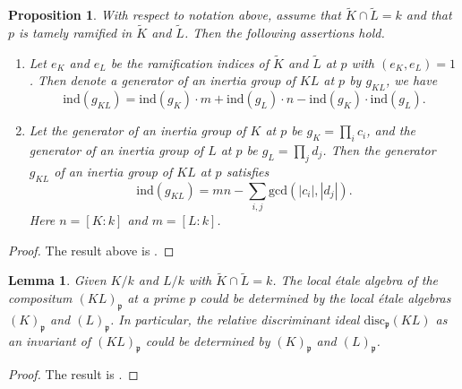 \documentclass[11pt]{amsart}
\newtheorem{Lemma}[theorem]{Lemma}
\newtheorem{proposition}[theorem]{Proposition}
\newcommand{\fp}{\mathfrak{p}}
\newcommand{\rdisc}{\mathrm{disc}}
\newcommand{\ind}{\mathrm{ind}}
\numberwithin{equation}{section}
\begin{document}
\begin{proposition}\label{tr places}
With respect to notation above, assume that $\widetilde{K}\cap \widetilde{L}=k$ and that $p$ is tamely ramified in $\widetilde{K}$ and $\widetilde{L}$. Then the following assertions hold.
\begin{enumerate}
    \item Let $e_K$ and $e_L$ be the ramification indices of $\widetilde{K}$ and $\widetilde{L}$ at $p$ with $(e_K, e_L) = 1$. Then denote a generator of an inertia group of $KL$ at $p$ by $g_{KL}$, we have
\[
\ind(g_{KL}) = \ind(g_{K})\cdot m + \ind(g_L)\cdot n - \ind(g_K) \cdot \ind(g_L).
\]
\item Let the
generator of an inertia group of $K$ at $p$ be $g_K =\prod_{i}c_i$, and the generator of an inertia group of $L$ at $p$ be $g_L =\prod_{j} d_j$. Then the generator $g_{KL}$ of an inertia group of $KL$ at $p$ satisfies
\[
\ind(g_{KL}) = mn - \sum_{i,j}\mathrm{gcd}(|c_i|,|d_j|).
\]
Here $n = [K : k]$ and $m = [L : k]$.
\end{enumerate}
\end{proposition}
\begin{proof}
   The result above is \cite[Theorem 2.2, 2.3]{Wang2020}.
\end{proof}


\begin{Lemma}\label{disc_inv}
    Given $K/k$ and $L/k$ with $\widetilde{K} \cap \widetilde{L} = k$. The local étale algebra of the compositum $(KL)_{\fp}$ at a prime $p$ could be determined by the local étale algebras $(K)_{\fp}$ and $(L)_{\fp}$. In particular, the relative discriminant ideal $\rdisc_{\fp}(KL)$ as an invariant of $(KL)_{\fp}$ could be determined by $(K)_{\fp}$ and $(L)_{\fp}$.
\end{Lemma}
\begin{proof}
    The result is \cite[Theorem 2.4]{Wang2020}.
\end{proof}
\end{document}
